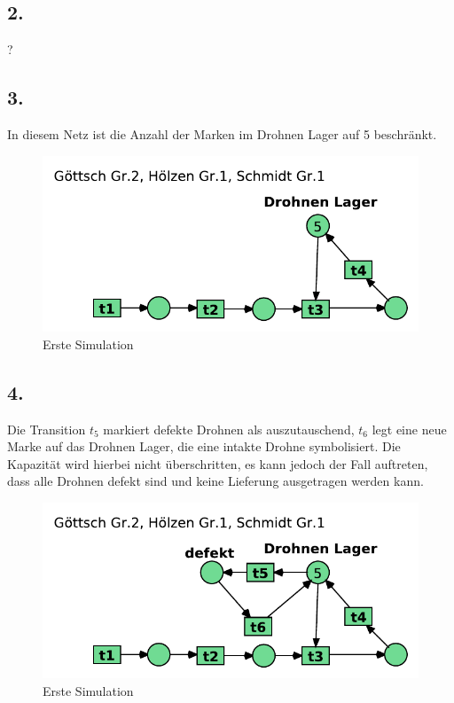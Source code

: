 \documentclass[12pt, paper=a4]{article}
\begin{document}
\subsection*{2.}
?

\subsection*{3.}
In diesem Netz ist die Anzahl der Marken im Drohnen Lager auf 5 beschränkt.\\

\begin{figure}[h!]
	\centering
	\includegraphics[scale=0.8]{8-5-3.pdf}
	\caption{Erste Simulation}
\end{figure}

\subsection*{4.}
Die Transition $t_5$ markiert defekte Drohnen als auszutauschend, $t_6$ legt eine neue Marke auf das Drohnen Lager, die eine intakte Drohne symbolisiert. Die Kapazität wird hierbei nicht überschritten, es kann jedoch der Fall auftreten, dass alle Drohnen defekt sind und keine Lieferung ausgetragen werden kann.\\

\begin{figure}[h!]
	\centering
	\includegraphics[scale=0.8]{8-5-4.pdf}
	\caption{Erste Simulation}
\end{figure}
\end{document}
